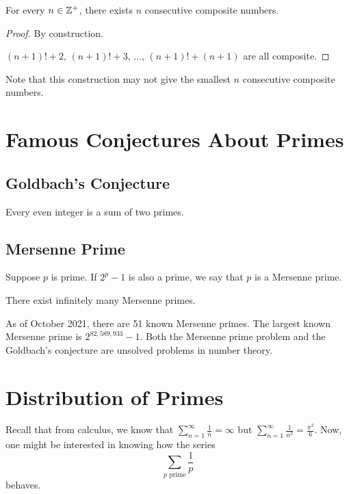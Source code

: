 \begin{proposition}
    For every $n \in \mathbb{Z}^+$, there exists $n$ consecutive composite numbers.
\end{proposition}

\begin{proof}
    By construction.

    $(n+1)! + 2$, $(n+1)! + 3$, $\ldots$, $(n+1)! + (n+1)$ are all composite.
\end{proof}

Note that this construction may not give the smallest $n$ consecutive composite numbers.

\section{Famous Conjectures About Primes}
\subsection{Goldbach's Conjecture}

\begin{conjecture}[Goldbach]
    Every even integer is a sum of two primes.
\end{conjecture}

\subsection{Mersenne Prime}

\begin{definition}
    Suppose $p$ is prime. If $2^p - 1$ is also a prime, we say that $p$ is a Mersenne prime.
\end{definition}

\begin{conjecture}
    There exist infinitely many Mersenne primes.
\end{conjecture}

As of October 2021, there are 51 known Mersenne primes. The largest known Mersenne prime is $2^{82,589,933} - 1$. Both the Mersenne prime problem and the Goldbach's conjecture are unsolved problems in number theory.

\section{Distribution of Primes}

Recall that from calculus, we know that
$
\sum_{n=1}^{\infty} \frac{1}{n} = \infty
$
but
$
\sum_{n=1}^{\infty} \frac{1}{n^2} = \frac{\pi^2}{6}.
$
Now, one might be interested in knowing how the series
$$
\sum_{\text{$p$ prime}} \frac{1}{p}
$$
behaves.

